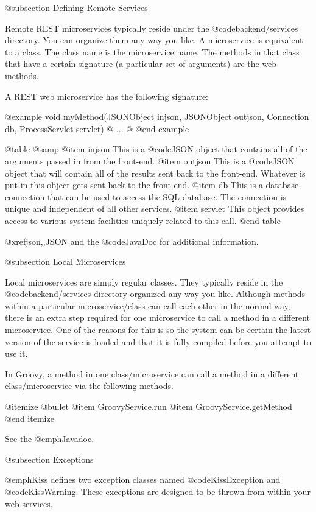 @subsection Defining Remote Services

Remote REST microservices typically reside under the
@code{backend/services} directory.  You can organize them any way you
like.  A microservice is equivalent to a class.  The class name is the
microservice name.  The methods in that class that have a certain
signature (a particular set of arguments) are the web methods.

A REST web microservice has the following signature:

@example
void myMethod(JSONObject injson, 
              JSONObject outjson, 
              Connection db, 
              ProcessServlet servlet) @{
...
@}
@end example

@table @samp
@item injson
This is a @code{JSON} object that contains all of the arguments passed
in from the front-end.
@item outjson
This is a @code{JSON} object that will contain all of the results
sent back to the front-end.  Whatever is put in this object gets sent back to the front-end.
@item db
This is a database connection that can be used to access the SQL database.  The
connection is unique and independent of all other services.
@item servlet
This object provides access to various system facilities uniquely related
to this call.
@end table

@xref{json,,JSON} and the @code{JavaDoc} for additional information.


@subsection Local Microservices

Local microservices are simply regular classes.  They typically reside
in the @code{backend/services} directory organized any way you like.
Although methods within a particular microservice/class can call each
other in the normal way, there is an extra step required for one
microservice to call a method in a different microservice.  One of the
reasons for this is so the system can be certain the latest version of
the service is loaded and that it is fully compiled before you attempt
to use it.

In Groovy, a method in one class/microservice can call a method
in a different class/microservice via the following methods.

@itemize @bullet
@item
GroovyService.run
@item
GroovyService.getMethod
@end itemize

See the @emph{Javadoc}.

@subsection Exceptions

@emph{Kiss} defines two exception classes named @code{KissException}
and @code{KissWarning}.  These exceptions are designed to be thrown
from within your web services.


